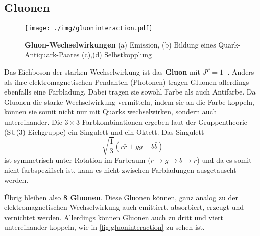 \subsection{Gluonen}
\begin{figure}
	\centering
	\texttt{[image: ./img/gluoninteraction.pdf]}
	\caption[Gluon-Wechselwirkungen]{\textbf{Gluon-Wechselwirkungen} (a) Emission, (b) Bildung eines Quark-Antiquark-Paares (c),(d) Selbstkopplung}
	\label{fig:gluoninteraction}
\end{figure}
Das Eichboson der starken Wechselwirkung ist das \textbf{Gluon} mit $J^P=1^-$.
Anders als ihre elektromagnetischen Pendanten (Photonen) tragen Gluonen allerdings ebenfalls eine Farbladung.
Dabei tragen sie sowohl Farbe als auch Antifarbe.
Da Gluonen die starke Wechselwirkung vermitteln, indem sie an die Farbe koppeln, können sie somit nicht nur mit Quarks wechselwirken, sondern auch untereinander.
Die $3\times 3$ Farbkombinationen ergeben laut der Gruppentheorie (SU(3)-Eichgruppe) ein Singulett und ein Oktett.
Das Singulett
\begin{equation*}
	\sqrt{\frac{1}{3}}\left(r\bar{r}+g\bar{g}+b\bar{b}\right)
\end{equation*}
ist symmetrisch unter Rotation im Farbraum ($r\rightarrow g\rightarrow b \rightarrow r$) und da es somit nicht farbspezifisch ist, kann es nicht zwischen Farbladungen ausgetauscht werden.

Übrig bleiben also \textbf{8 Gluonen}.
Diese Gluonen können, ganz analog zu der elektromagnetischen Wechselwirkung auch emittiert, absorbiert, erzeugt und vernichtet werden.
Allerdings können Gluonen auch zu dritt und viert untereinander koppeln, wie in \autoref{fig:gluoninteraction} zu sehen ist.
